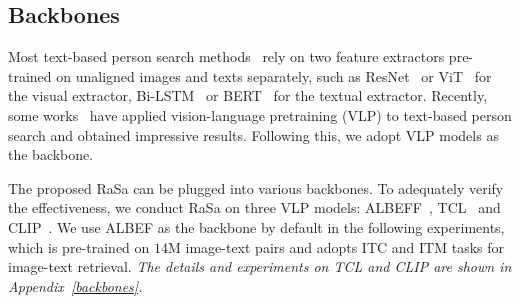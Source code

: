 \documentclass{article}
\begin{document}
\subsection{Backbones}
\label{Baselines}


Most text-based person search methods~\cite{li2022learning,shao2022learning} rely on two feature extractors pre-trained on unaligned images and texts separately, such as ResNet~\cite{he2016deep} or ViT~\cite{dosovitskiy2020image} for the visual extractor, Bi-LSTM~\cite{hochreiter1997long} or BERT~\cite{devlin2018bert} for the textual extractor. 
Recently, some works~\cite{shu2022see,yan2022clip} have applied vision-language pretraining (VLP) to text-based person search and obtained impressive results. 
Following this, we adopt VLP models as the backbone.

The proposed RaSa can be plugged into various backbones. 
To adequately verify the effectiveness, we conduct RaSa on three VLP models: ALBEFF~\cite{NEURIPS2021_50525975}, TCL~\cite{yang2022vision} and CLIP~\cite{radford2021learning}. 
We use ALBEF as the backbone by default in the following experiments, which is pre-trained on $14$M image-text pairs and adopts ITC and ITM tasks for image-text retrieval.
\emph{The details and experiments on TCL and CLIP are shown in Appendix~\ref{backbones}.}
\end{document}
